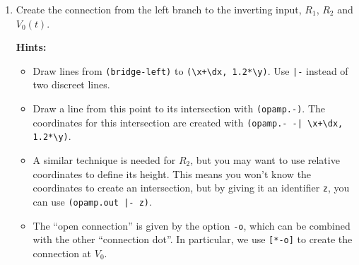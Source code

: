 \begin{enumerate}
\begin{enumerate}
        \item Create the connection from the left branch to the inverting input, $R_1$, $R_2$ and $V_0(t)$.
        
        \textbf{Hints:}
        \begin{itemize}
            \item Draw lines from \texttt{(bridge-left)} to \verb|(\x+\dx, 1.2*\y)|. Use \verb!|-! instead of two discreet lines.
            \item Draw a line from this point to its intersection with \verb|(opamp.-)|. The coordinates for this intersection are created with \verb!(opamp.- -| \x+\dx, 1.2*\y)!.
            \item A similar technique is needed for \( R_2 \), but you may want to use relative coordinates to define its height. This means you won't know the coordinates to create an intersection, but by giving it an identifier \verb|z|, you can use \verb!(opamp.out |- z)!.
            \item The ``open connection'' is given by the option \verb|-o|, which can be combined with the other ``connection dot''. In particular, we use \verb|[*-o]| to create the connection at \( V_0 \). 
        \end{itemize}
    \end{enumerate}
\end{enumerate}